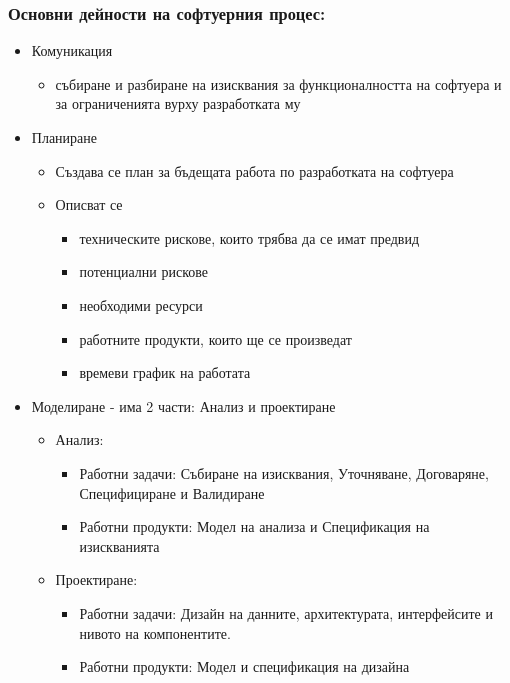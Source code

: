 \documentclass[fleqn,12pt]{article}
\begin{document}
\subsubsection{Основни дейности на софтуерния процес:}
\begin{itemize}
	
	\item Комуникация
	\begin{itemize}
		\item събиране и разбиране на изисквания за функционалността на софтуера и за ограниченията вурху разработката му
	\end{itemize}
	
	\item Планиране
	\begin{itemize}
		\item Създава се план за бъдещата работа по разработката на софтуера
		\item Описват се
		\begin{itemize}
			\item техническите рискове, които трябва да се имат предвид
			\item потенциални рискове
			\item необходими ресурси
			\item работните продукти, които ще се произведат
			\item времеви график на работата
		\end{itemize}
	\end{itemize}
	
	\item Моделиране - има 2 части: Анализ и проектиране
	\begin{itemize}
		\item Анализ:
		\begin{itemize}
			\item Работни задачи: Събиране на изисквания, Уточняване, Договаряне, Специфициране и Валидиране
			\item Работни продукти: Модел на анализа и Спецификация на изискванията
		\end{itemize}
		
		\item Проектиране:
		\begin{itemize}
			\item Работни задачи: Дизайн на данните, архитектурата, интерфейсите и нивото на компонентите.
			\item Работни продукти: Модел и спецификация на дизайна
		\end{itemize}
	\end{itemize}


\end{itemize}
\end{document}
